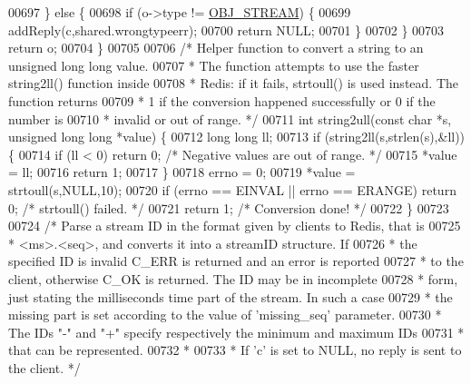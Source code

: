 \begin{DoxyCode}
{{00697     \} \textcolor{keywordflow}{else} \{
00698         \textcolor{keywordflow}{if} (o->type != \hyperlink{server_8h_a2c2cc41300ca6b9daca7ea8a6d66edc6}{OBJ\_STREAM}) \{
00699             addReply(c,shared.wrongtypeerr);
00700             \textcolor{keywordflow}{return} NULL;
00701         \}
00702     \}
00703     \textcolor{keywordflow}{return} o;
00704 \}
00705 
00706 \textcolor{comment}{/* Helper function to convert a string to an unsigned long long value.}
00707 \textcolor{comment}{ * The function attempts to use the faster string2ll() function inside}
00708 \textcolor{comment}{ * Redis: if it fails, strtoull() is used instead. The function returns}
00709 \textcolor{comment}{ * 1 if the conversion happened successfully or 0 if the number is}
00710 \textcolor{comment}{ * invalid or out of range. */}
00711 \textcolor{keywordtype}{int} string2ull(\textcolor{keyword}{const} \textcolor{keywordtype}{char} *s, \textcolor{keywordtype}{unsigned} \textcolor{keywordtype}{long} \textcolor{keywordtype}{long} *value) \{
00712     \textcolor{keywordtype}{long} \textcolor{keywordtype}{long} ll;
00713     \textcolor{keywordflow}{if} (string2ll(s,strlen(s),&ll)) \{
00714         \textcolor{keywordflow}{if} (ll < 0) \textcolor{keywordflow}{return} 0; \textcolor{comment}{/* Negative values are out of range. */}
00715         *value = ll;
00716         \textcolor{keywordflow}{return} 1;
00717     \}
00718     errno = 0;
00719     *value = strtoull(s,NULL,10);
00720     \textcolor{keywordflow}{if} (errno == EINVAL || errno == ERANGE) \textcolor{keywordflow}{return} 0; \textcolor{comment}{/* strtoull() failed. */}
00721     \textcolor{keywordflow}{return} 1; \textcolor{comment}{/* Conversion done! */}
00722 \}
00723 
00724 \textcolor{comment}{/* Parse a stream ID in the format given by clients to Redis, that is}
00725 \textcolor{comment}{ * <ms>.<seq>, and converts it into a streamID structure. If}
00726 \textcolor{comment}{ * the specified ID is invalid C\_ERR is returned and an error is reported}
00727 \textcolor{comment}{ * to the client, otherwise C\_OK is returned. The ID may be in incomplete}
00728 \textcolor{comment}{ * form, just stating the milliseconds time part of the stream. In such a case}
00729 \textcolor{comment}{ * the missing part is set according to the value of 'missing\_seq' parameter.}
00730 \textcolor{comment}{ * The IDs "-" and "+" specify respectively the minimum and maximum IDs}
00731 \textcolor{comment}{ * that can be represented.}
00732 \textcolor{comment}{ *}
00733 \textcolor{comment}{ * If 'c' is set to NULL, no reply is sent to the client. */}
}}
\end{DoxyCode}

